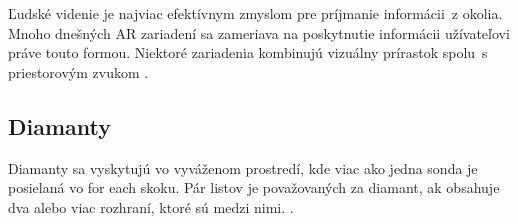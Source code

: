 \documentclass[a4paper, titlepage, 11pt]{article}
\begin{document}
Ľudské videnie je najviac efektívnym zmyslom pre príjmanie informácii~z okolia. Mnoho dnešných AR zariadení sa zameriava na poskytnutie informácii užívateľovi práve touto formou. Niektoré zariadenia kombinujú vizuálny prírastok spolu~s priestorovým zvukom
\cite{mastersthesis:96345}.

\subsection{Diamanty}
Diamanty sa vyskytujú vo vyváženom prostredí, kde viac ako jedna sonda je posielaná vo for each skoku. Pár listov je považovaných za diamant, ak obsahuje dva alebo viac rozhraní, ktoré sú medzi nimi.
\cite{mastersthesis:97465}.


\newpage

\end{document}

